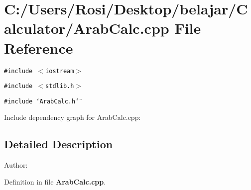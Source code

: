 \section{C:/Users/Rosi/Desktop/belajar/Calculator/Arab\-Calc.cpp File Reference}
\label{_arab_calc_8cpp}
{\tt \#include $<$iostream$>$}\par
{\tt \#include $<$stdlib.h$>$}\par
{\tt \#include \char`\"{}Arab\-Calc.h\char`\"{}}\par


Include dependency graph for Arab\-Calc.cpp:

\subsection{Detailed Description}
\begin{Desc}
\item[Author:]\end{Desc}


Definition in file {\bf Arab\-Calc.cpp}.